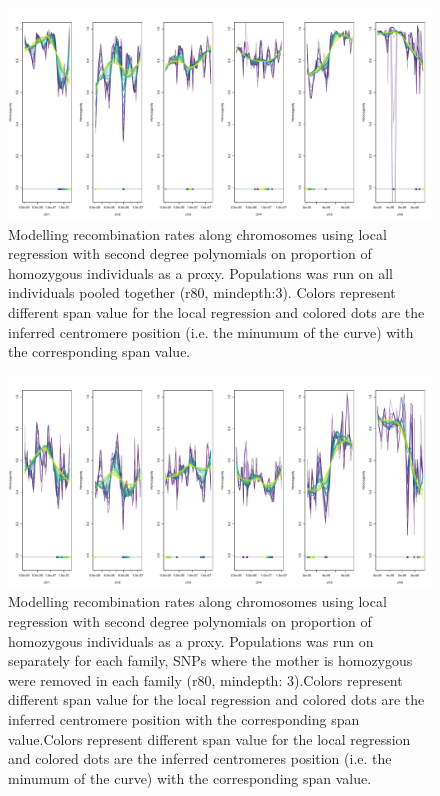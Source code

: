 \documentclass[10pt,a4paper]{report}
\begin{document}
\begin{figure}[h]
	\begin{center}
		\includegraphics[width=1\textwidth]{Num_CSD_loci/centro_group_d3r80_degree2.pdf}
		\caption{Modelling recombination rates along chromosomes using local regression with second degree polynomials on proportion of homozygous individuals as a proxy. Populations was run on all individuals pooled together (r80, mindepth:3). Colors represent different span value for the local regression and colored dots are the inferred centromere position (i.e. the minumum of the curve) with the corresponding span value.}
		\label{centro_all}
	\end{center}
\end{figure}

\begin{figure}[h]
	\begin{center}
		\includegraphics[width=\textwidth]{Num_CSD_loci/centro_fam_d3r80_degree2.pdf}
		\caption{Modelling recombination rates along chromosomes using local regression with second degree polynomials on proportion of homozygous individuals as a proxy. Populations was run on separately for each family, SNPs where the mother is homozygous were removed in each family (r80, mindepth: 3).Colors represent different span value for the local regression and colored dots are the inferred centromere position with the corresponding span value.Colors represent different span value for the local regression and colored dots are the inferred centromeres position (i.e. the minumum of the curve) with the corresponding span value.}
		\label{centro_fam}
	\end{center}
\end{figure}
\end{document}
